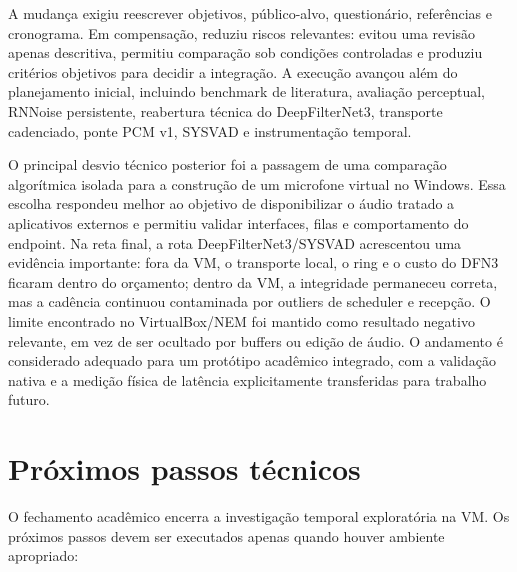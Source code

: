 A mudança exigiu reescrever objetivos, público-alvo, questionário, referências e cronograma. Em compensação, reduziu riscos relevantes: evitou uma revisão apenas descritiva, permitiu comparação sob condições controladas e produziu critérios objetivos para decidir a integração. A execução avançou além do planejamento inicial, incluindo benchmark de literatura, avaliação perceptual, RNNoise persistente, reabertura técnica do DeepFilterNet3, transporte cadenciado, ponte PCM v1, SYSVAD e instrumentação temporal.

O principal desvio técnico posterior foi a passagem de uma comparação algorítmica isolada para a construção de um microfone virtual no Windows. Essa escolha respondeu melhor ao objetivo de disponibilizar o áudio tratado a aplicativos externos e permitiu validar interfaces, filas e comportamento do endpoint. Na reta final, a rota DeepFilterNet3/SYSVAD acrescentou uma evidência importante: fora da VM, o transporte local, o ring e o custo do DFN3 ficaram dentro do orçamento; dentro da VM, a integridade permaneceu correta, mas a cadência continuou contaminada por outliers de scheduler e recepção. O limite encontrado no VirtualBox/NEM foi mantido como resultado negativo relevante, em vez de ser ocultado por buffers ou edição de áudio. O andamento é considerado adequado para um protótipo acadêmico integrado, com a validação nativa e a medição física de latência explicitamente transferidas para trabalho futuro.

\section{Próximos passos técnicos}

O fechamento acadêmico encerra a investigação temporal exploratória na VM. Os próximos passos devem ser executados apenas quando houver ambiente apropriado:


